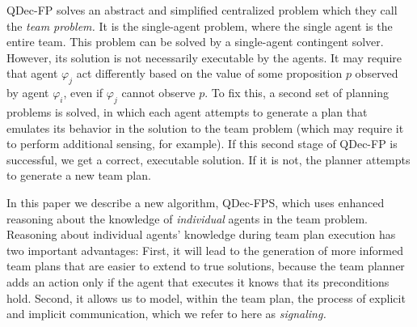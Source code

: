 \documentclass[letterpaper]{article} %
\theoremstyle{definition}
\begin{document}
QDec-FP solves an abstract and simplified centralized problem which they call the {\em team problem.} 
%
It is the single-agent problem, where the single agent is the entire team. This problem can be solved by a single-agent contingent solver. 
However, its solution
is not necessarily executable by the agents. It may require that agent $\varphi_j$ act differently based on the value of some proposition $p$ observed by agent $\varphi_i$, even if $\varphi_j$ cannot observe $p$. 
To fix this, a second set of planning problems is solved, in which each agent attempts to generate a plan that emulates its behavior in the solution to the team problem (which may require it to perform additional sensing, for example). 
If this  second stage of QDec-FP is successful, we get a correct, executable solution. If it is not, the planner attempts to generate a new team plan.

In this paper we describe a new algorithm, QDec-FPS, which uses enhanced reasoning about the  knowledge of {\em individual} agents in the team problem.
Reasoning about individual agents' knowledge
during team plan execution has two important advantages: First, it will lead to the generation of more informed team plans that are easier to extend to true solutions, because the team planner adds an action only if the agent that executes it knows that its preconditions hold.
Second, it allows us to model, within the team plan, the process of explicit and implicit communication, which we refer to here as {\em signaling.}

\end{document}

